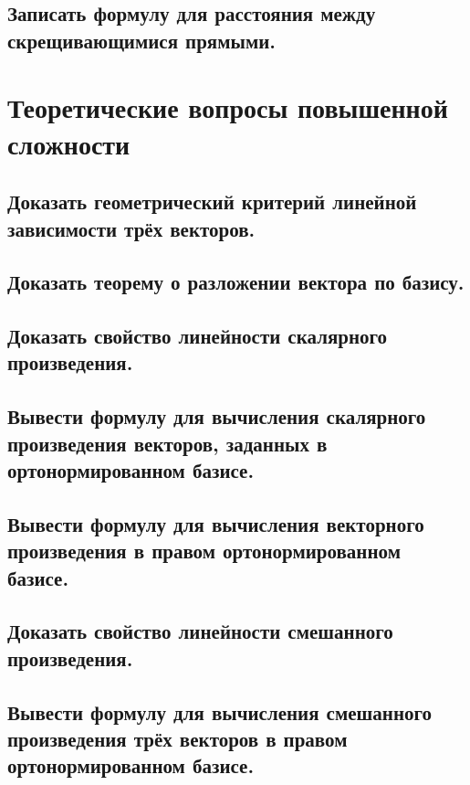 \documentclass[a4paper, 10pt]{article}
\begin{document}
\subsection{Записать формулу для расстояния между скрещивающимися прямыми.}

\section{Теоретические вопросы повышенной сложности}

\subsection{Доказать геометрический критерий линейной зависимости трёх векторов.}



\subsection{Доказать теорему о разложении вектора по базису.}



\subsection{Доказать свойство линейности скалярного произведения.}



\subsection{Вывести формулу для вычисления скалярного произведения векторов, заданных в ортонормированном базисе.}



\subsection{Вывести формулу для вычисления векторного произведения в правом ортонормированном базисе.}



\subsection{Доказать свойство линейности смешанного произведения.}



\subsection{Вывести формулу для вычисления смешанного произведения трёх векторов в правом ортонормированном базисе.}
\end{document}
